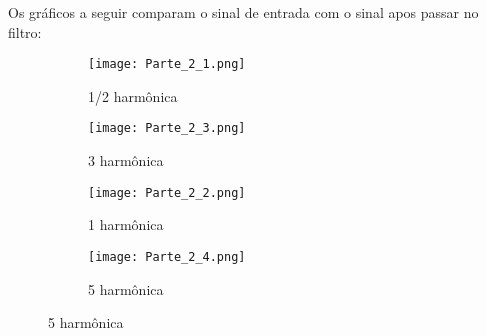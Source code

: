 \documentclass{article}
\begin{document}
        Os gráficos a seguir comparam o sinal de entrada com o sinal apos passar no filtro:
        \begin{figure}[H]
            \begin{multicols}{2}
                \begin{figure}[H]
                    \begin{center}
                        \texttt{[image: Parte\_2\_1.png]}
                        \caption{1/2 harmônica}
                        \label{fig:Parte_2_1}
                    \end{center}
                \end{figure}
                \begin{figure}[H]
                    \begin{center}
                        \texttt{[image: Parte\_2\_3.png]}
                        \caption{3 harmônica}
                        \label{fig:Parte_2_3}
                    \end{center}
                \end{figure}
                
                \begin{figure}[H]
                    \begin{center}
                        \texttt{[image: Parte\_2\_2.png]}
                        \caption{1 harmônica}
                        \label{fig:Parte_2_2}
                    \end{center}
                \end{figure}
                \begin{figure}[H]
                    \begin{center}
                        \texttt{[image: Parte\_2\_4.png]}
                        \caption{5 harmônica}
                        \label{fig:Parte_2_4}
                    \end{center}
                \end{figure}
            \end{multicols}
        \end{figure}
\end{document}

